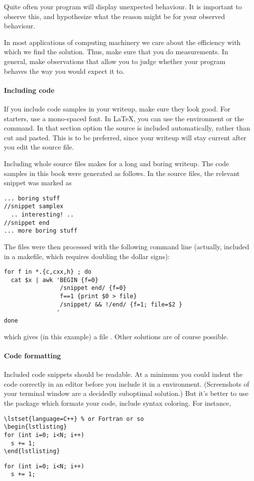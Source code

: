 Quite often your program will display unexpected behaviour. It is important to observe
this, and hypothesize what the reason might be for your observed behaviour.

In most applications of computing machinery we care about the efficiency with which
we find the solution. Thus, make sure that you do measurements. In general, make
observations that allow you to judge whether your program behaves the way you
would expect it to.

\paragraph*{Including code}

If you include code samples in your writeup, make sure they look good. For starters,
use a mono-spaced font. In \LaTeX, you can use the  environment or the 
 command. In that section option the source is included automatically,
rather than cut and pasted. This is to be preferred, since your writeup will
stay current after you edit the source file.

Including whole source files makes for a long and boring writeup. The code samples in this
book were generated as follows. In the source files, the relevant snippet was marked as
\begin{verbatim}
... boring stuff
//snippet samplex
  .. interesting! ..
//snippet end
... more boring stuff
\end{verbatim}
The files were then processed with the following command line (actually, included
in a makefile, which requires doubling the dollar signs):
\begin{verbatim}
for f in *.{c,cxx,h} ; do
  cat $x | awk 'BEGIN {f=0}
                /snippet end/ {f=0}
                f==1 {print $0 > file}
                /snippet/ && !/end/ {f=1; file=$2 }
               '
done
\end{verbatim}
which gives (in this example) a file . Other solutions are of course possible.

\paragraph*{\bf Code formatting}

Included code snippets should be readable. At a minimum you could 
indent the code correctly in an editor before you include it in
a  environment. (Screenshots of your terminal
window are a decidedly suboptimal solution.)
But it's better to use the  package which formats
your code, include syntax coloring. For instance, 
\begin{verbatim}
\lstset{language=C++} % or Fortran or so
\begin{lstlisting}
for (int i=0; i<N; i++)
  s += 1;
\end{lstlisting}
\end{verbatim}
\lstset{language=C++} %
\begin{lstlisting}
for (int i=0; i<N; i++)
  s += 1;
\end{lstlisting}

